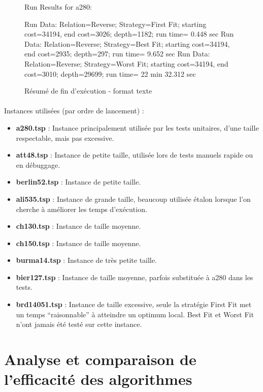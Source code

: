 \documentclass[a4paper,10pt]{report}
\begin{document}
\begin{figure}[h]
Run Results for a280:
 \begin{center}
Run Data: Relation=Reverse;	Strategy=First Fit;	starting cost=34194,	end cost=3026;	depth=1182;	run time= 0.448 sec\linebreak
Run Data: Relation=Reverse;	Strategy=Best Fit;	starting cost=34194,	end cost=2935;	depth=297;	run time= 9.652 sec\linebreak
Run Data: Relation=Reverse;	Strategy=Worst Fit;	starting cost=34194,	end cost=3010;	depth=29699;	run time= 22 min 32.312 sec\linebreak
 \end{center}
  \label{a280-sample-results}
  \caption{Résumé de fin d'exécution - format texte}
\end{figure}

\paragraph{}
Instances utilisées (par ordre de lancement) :
\begin{itemize}
  \item \textbf{a280.tsp} : Instance principalement utilisée par les tests unitaires, d'une taille respectable, mais pas excessive.
  \item \textbf{att48.tsp} : Instance de petite taille, utilisée lors de tests manuels rapide ou en débuggage.
  \item \textbf{berlin52.tsp} : Instance de petite taille.
  \item \textbf{ali535.tsp} : Instance de grande taille, beaucoup utilisée étalon lorsque l'on cherche à améliorer les temps
d'exécution.
  \item \textbf{ch130.tsp} : Instance de taille moyenne.
  \item \textbf{ch150.tsp} : Instance de taille moyenne.
  \item \textbf{burma14.tsp} : Instance de très petite taille.
  \item \textbf{bier127.tsp} : Instance de taille moyenne, parfois substituée à a280 dans les tests.
  \item \textbf{brd14051.tsp} : Instance de taille excessive, seule la stratégie First Fit met un temps ``raisonnable''
à atteindre un optimum local. Best Fit et Worst Fit n'ont jamais été testé sur cette instance.
\end{itemize}

\pagebreak
\section{Analyse et comparaison de l'efficacité des algorithmes}
\end{document}
